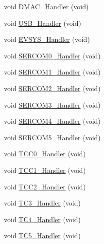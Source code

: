 \begin{DoxyCompactItemize}
\item 
void \mbox{\hyperlink{group___s_a_m_d21_g17_a__cmsis_ga8e064c26f3a32acb9fcd7bfac1fc45a6}{D\+M\+A\+C\+\_\+\+Handler}} (void)
\item 
void \mbox{\hyperlink{group___s_a_m_d21_g17_a__cmsis_ga38c26073ef07063ed778df5fb292fce3}{U\+S\+B\+\_\+\+Handler}} (void)
\item 
void \mbox{\hyperlink{group___s_a_m_d21_g17_a__cmsis_gabe3895797afdd885a182036e3ab0060b}{E\+V\+S\+Y\+S\+\_\+\+Handler}} (void)
\item 
void \mbox{\hyperlink{group___s_a_m_d21_g17_a__cmsis_ga14a9a5fe00eb8d6cd9e3790e49043ed9}{S\+E\+R\+C\+O\+M0\+\_\+\+Handler}} (void)
\item 
void \mbox{\hyperlink{group___s_a_m_d21_g17_a__cmsis_gafb091253d0785769e80682915752b5c4}{S\+E\+R\+C\+O\+M1\+\_\+\+Handler}} (void)
\item 
void \mbox{\hyperlink{group___s_a_m_d21_g17_a__cmsis_ga3625c4b87bfd7bd2a5fdbdce6046a840}{S\+E\+R\+C\+O\+M2\+\_\+\+Handler}} (void)
\item 
void \mbox{\hyperlink{group___s_a_m_d21_g17_a__cmsis_ga5b1bbdf8e669c1b17736584dff204599}{S\+E\+R\+C\+O\+M3\+\_\+\+Handler}} (void)
\item 
void \mbox{\hyperlink{group___s_a_m_d21_g17_a__cmsis_ga39ad83aaf151456b1c4b3087ead0f892}{S\+E\+R\+C\+O\+M4\+\_\+\+Handler}} (void)
\item 
void \mbox{\hyperlink{group___s_a_m_d21_g17_a__cmsis_ga161a0db2be887e8495fa5c23d0862824}{S\+E\+R\+C\+O\+M5\+\_\+\+Handler}} (void)
\item 
void \mbox{\hyperlink{group___s_a_m_d21_g17_a__cmsis_gaff4b3092699ca4f7382621f3443688a3}{T\+C\+C0\+\_\+\+Handler}} (void)
\item 
void \mbox{\hyperlink{group___s_a_m_d21_g17_a__cmsis_gaaa9421127bf93f9b4ccfb0a6ffcf94c2}{T\+C\+C1\+\_\+\+Handler}} (void)
\item 
void \mbox{\hyperlink{group___s_a_m_d21_g17_a__cmsis_ga5dccf47df0e19e941bc4758a82db1906}{T\+C\+C2\+\_\+\+Handler}} (void)
\item 
void \mbox{\hyperlink{group___s_a_m_d21_g17_a__cmsis_gae69893861c9ce728a475a17e26296582}{T\+C3\+\_\+\+Handler}} (void)
\item 
void \mbox{\hyperlink{group___s_a_m_d21_g17_a__cmsis_ga0c1fbde5812fec0be065efcc9d864efd}{T\+C4\+\_\+\+Handler}} (void)
\item 
void \mbox{\hyperlink{group___s_a_m_d21_g17_a__cmsis_gab72ac9948c9e1d1a59863025b29f70c4}{T\+C5\+\_\+\+Handler}} (void)
\item 

\end{DoxyCompactItemize}
